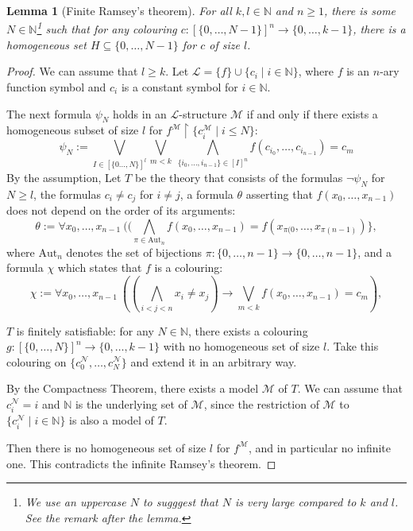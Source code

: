 \documentclass[a4paper, 11pt]{amsart}
\newtheorem{lemma}[lemma]{Lemma}
\theoremstyle{remark}
\newcommand{\NN}{\mathbb{N}}
\newcommand{\cL}{\mathcal L}
\newcommand{\cM}{\mathcal M}
\newcommand{\cN}{\mathcal N}
\begin{document}
\begin{lemma}[Finite Ramsey's theorem] 
For all $k,l \in \NN$ and $n\geq 1$, there is some $N\in \NN$\footnote{We use an uppercase $N$ to sugggest that $N$ is very large compared to $k$ and $l$. See the remark after the lemma. }  such that for any colouring $c\colon [\{ 0,\dots, N-1 \}]^n \rightarrow \{0,\dots,k-1\}$, there is a homogeneous set $H\subseteq \{0,\dots, N-1\}$ for $c$ of size $l$. 
\end{lemma} 
\begin{proof} 
We can assume that $l\geq k$. 
Let $\cL=\{f\} \cup \{c_i \mid i\in \NN\} $,
where $f$ is an $n$-ary function symbol and $c_i$ is a constant symbol for $i\in\NN$. 

The next formula $\psi_N$ holds in an $\cL$-structure $\cM$ if and only if there exists a homogeneous subset of size $l$ for $f^\cM {\upharpoonright} \{ c_i^\cM \mid i\leq N \}$: 
$$ \psi_N := \bigvee_{I\in [\{0\dots, N\}]^l} \bigvee_{m<k} \  \bigwedge_{\{i_0, \dots, i_{n-1}\} \in [I]^n}  f(c_{i_0},\dots,c_{i_{n-1}}) = c_m   $$ 
By the assumption, 
Let $T$ be the theory that consists of the formulas $\neg\psi_N$ for $N\geq l$, the formulas $c_i\neq c_j$ for $i\neq j$, 
{\color{blue} 
a formula $\theta$ asserting that $f(x_0,\dots,x_{n-1})$ does not depend on the order of its arguments: 
$$\theta := \forall x_0,\dots, x_{n-1}\ ((\bigwedge_{\pi\in\mathrm{Aut}_n} f(x_0,\dots,x_{n-1})=f(x_{\pi(0
},\dots,x_{\pi(n-1)}) \}  ,$$  
where $\mathrm{Aut}_n$ denotes the set of bijections $ \pi\colon \{0,\dots,n-1\} \rightarrow \{0,\dots,n-1\}$, 
} 
and a formula $\chi$ which states that $f$ is a colouring: 
$$\chi := \forall x_0,\dots, x_{n-1}\ ((\bigwedge_{i<j<n}  x_i \neq x_j ) \rightarrow \bigvee_{m<k} f(x_0, \dots, x_{n-1}) = c_m ),$$  


$T$ is finitely satisfiable: for any $N\in \NN$, there exists a colouring $g\colon [\{0,\dots,N\}]^n \rightarrow \{0,\dots,k-1\}$ with no homogeneous set of size $l$. 
Take this colouring on $\{c_0^\cN,\dots,c_N^\cN\}$ and extend it in an arbitrary way. 

By the Compactness Theorem, there exists a model $\cM$ of $T$. 
We can assume that $c_i^\cN=i$ and $\NN$ is the underlying set of $\cM$, since the restriction of $\cM$ to $\{c_i^\cN \mid i\in \NN\}$ is also a model of $T$. 

Then there is no homogeneous set of size $l$ for $f^\cM$, and in particular no infinite one. 
This contradicts the infinite Ramsey's theorem. 
\end{proof} 
\end{document}
